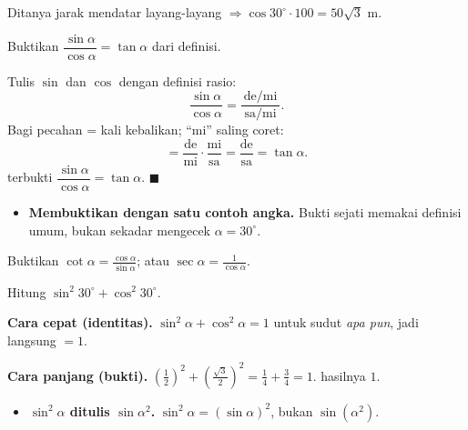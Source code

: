 \begin{variasi}
Ditanya jarak mendatar layang-layang $\Rightarrow \cos30^\circ\cdot100
=50\sqrt3$ m.
\end{variasi}

\begin{soalbox}{}
Buktikan $\dfrac{\sin\alpha}{\cos\alpha}=\tan\alpha$ dari definisi.
\end{soalbox}

\jawab
{} Tulis $\sin$ dan $\cos$ dengan definisi rasio:
\[
\frac{\sin\alpha}{\cos\alpha}=\frac{\ \text{de}/\text{mi}\ }{\ \text{sa}/\text{mi}\ }.
\]
 Bagi pecahan = kali kebalikan; ``mi'' saling coret:
\[
=\frac{\text{de}}{\text{mi}}\cdot\frac{\text{mi}}{\text{sa}}
=\frac{\text{de}}{\text{sa}}=\tan\alpha.
\]
\jadi terbukti $\dfrac{\sin\alpha}{\cos\alpha}=\tan\alpha$. $\blacksquare$

\begin{jebakan}
\begin{itemize}[leftmargin=*,topsep=2pt]
  \item \textbf{Membuktikan dengan satu contoh angka.} Bukti sejati memakai
  definisi umum, bukan sekadar mengecek $\alpha=30^\circ$.
\end{itemize}
\end{jebakan}

\begin{variasi}
Buktikan $\cot\alpha=\frac{\cos\alpha}{\sin\alpha}$; atau
$\sec\alpha=\frac{1}{\cos\alpha}$.
\end{variasi}

\begin{soalbox}{}
Hitung $\sin^2 30^\circ+\cos^2 30^\circ$.
\end{soalbox}

\jawab
\textbf{Cara cepat (identitas).} $\sin^2\alpha+\cos^2\alpha=1$ untuk sudut
\emph{apa pun}, jadi langsung $=1$.

\textbf{Cara panjang (bukti).}
$\left(\tfrac12\right)^2+\left(\tfrac{\sqrt3}{2}\right)^2
=\tfrac14+\tfrac34=1$. \checkmark
\jadi hasilnya $1$.

\begin{jebakan}
\begin{itemize}[leftmargin=*,topsep=2pt]
  \item \textbf{$\sin^2\alpha$ ditulis $\sin\alpha^2$.} $\sin^2\alpha=(\sin\alpha)^2$,
  bukan $\sin(\alpha^2)$.
\end{itemize}
\end{jebakan}

